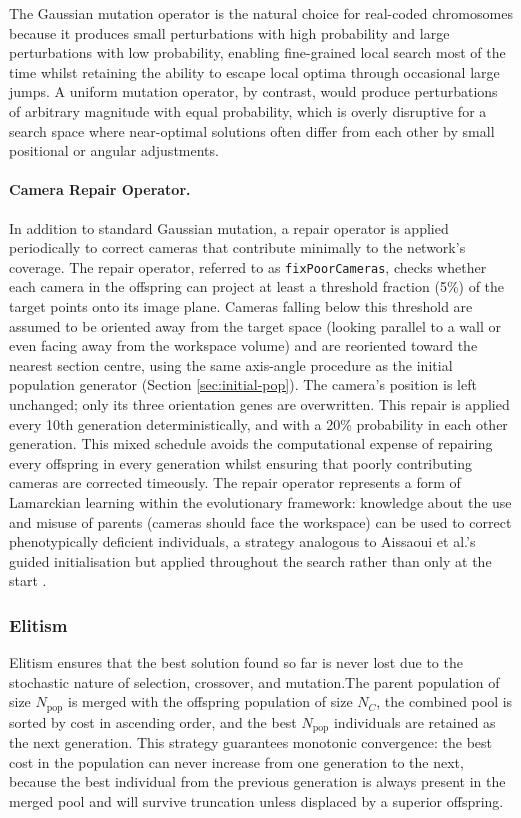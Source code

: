 The Gaussian mutation operator is the natural choice for real-coded chromosomes because it produces small perturbations with high probability and large perturbations with low probability, enabling fine-grained local search most of the time whilst retaining the ability to escape local optima through occasional large jumps. A uniform mutation operator, by contrast, would produce perturbations of arbitrary magnitude with equal probability, which is overly disruptive for a search space where near-optimal solutions often differ from each other by small positional or angular adjustments.

\paragraph{Camera Repair Operator.}
In addition to standard Gaussian mutation, a repair operator is applied periodically to correct cameras that contribute minimally to the network's coverage. The repair operator, referred to as \texttt{fixPoorCameras}, checks whether each camera in the offspring can project at least a threshold fraction (5\%) of the target points onto its image plane. Cameras falling below this threshold are assumed to be oriented away from the target space (looking parallel to a wall or even facing away from the workspace volume) and are reoriented toward the nearest section centre, using the same axis-angle procedure as the initial population generator (Section \ref{sec:initial-pop}). The camera's position is left unchanged; only its three orientation genes are overwritten. This repair is applied every 10th generation deterministically, and with a 20\% probability in each other generation. This mixed schedule avoids the computational expense of repairing every offspring in every generation whilst ensuring that poorly contributing cameras are corrected timeously. The repair operator represents a form of Lamarckian learning within the evolutionary framework: knowledge about the use and misuse of parents (cameras should face the workspace) can be used to correct phenotypically deficient individuals, a strategy analogous to Aissaoui et al.'s guided initialisation but applied throughout the search rather than only at the start \parencite{aissaouiDesigningCameraPlacement2018}.

\subsubsection{Elitism}
\label{sec:elitism}

Elitism ensures that the best solution found so far is never lost due to the stochastic nature of selection, crossover, and mutation.The parent population of size $N_{\text{pop}}$ is merged with the offspring population of size $N_C$, the combined pool is sorted by cost in ascending order, and the best $N_{\text{pop}}$ individuals are retained as the next generation. This strategy guarantees monotonic convergence: the best cost in the population can never increase from one generation to the next, because the best individual from the previous generation is always present in the merged pool and will survive truncation unless displaced by a superior offspring.

